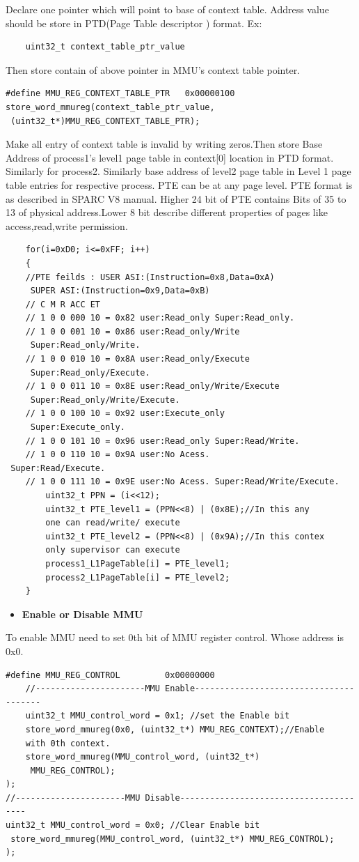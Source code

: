 \documentclass[12pt,a4paper]{article}
\begin{document}
Declare one pointer which will point to base of context table. Address value should be store in PTD(Page Table descriptor ) format.
Ex: 
\begin{lstlisting}
	uint32_t context_table_ptr_value 
 \end{lstlisting}
Then store contain of above pointer in MMU's context table pointer.
\begin{lstlisting}
#define MMU_REG_CONTEXT_TABLE_PTR	0x00000100
store_word_mmureg(context_table_ptr_value,
 (uint32_t*)MMU_REG_CONTEXT_TABLE_PTR);
 \end{lstlisting}
 
Make all entry of context table is invalid by writing zeros.Then store Base Address of process1's level1 page table in context[0] location in PTD format. Similarly for process2.
Similarly base address of level2 page table in Level 1 page table entries for respective process.
PTE can be at any page level.
PTE format is as described in SPARC V8 manual. Higher 24 bit of PTE contains Bits of 35 to 13 of physical address.Lower 8 bit describe different properties of pages like access,read,write permission.   
\begin{lstlisting}
	for(i=0xD0; i<=0xFF; i++)
	{
	//PTE feilds : USER ASI:(Instruction=0x8,Data=0xA)
	 SUPER ASI:(Instruction=0x9,Data=0xB)
	// C M R ACC ET
	// 1 0 0 000 10 = 0x82 user:Read_only Super:Read_only.
	// 1 0 0 001 10 = 0x86 user:Read_only/Write
	 Super:Read_only/Write.
	// 1 0 0 010 10 = 0x8A user:Read_only/Execute
	 Super:Read_only/Execute.
	// 1 0 0 011 10 = 0x8E user:Read_only/Write/Execute
	 Super:Read_only/Write/Execute.
	// 1 0 0 100 10 = 0x92 user:Execute_only
	 Super:Execute_only.
	// 1 0 0 101 10 = 0x96 user:Read_only Super:Read/Write.
	// 1 0 0 110 10 = 0x9A user:No Acess.
 Super:Read/Execute.
	// 1 0 0 111 10 = 0x9E user:No Acess. Super:Read/Write/Execute.
		uint32_t PPN = (i<<12);
		uint32_t PTE_level1 = (PPN<<8) | (0x8E);//In this any 
		one can read/write/ execute
		uint32_t PTE_level2 = (PPN<<8) | (0x9A);//In this contex 
		only supervisor can execute
		process1_L1PageTable[i] = PTE_level1;
		process2_L1PageTable[i] = PTE_level2;
	}
 \end{lstlisting}
 
\begin{itemize}
\item \textbf{Enable or Disable MMU}
\end{itemize} 
To enable MMU need to set 0th bit of MMU register control. Whose address is 0x0.
 \begin{lstlisting}
#define MMU_REG_CONTROL			0x00000000
	//----------------------MMU Enable---------------------------------------
	uint32_t MMU_control_word = 0x1; //set the Enable bit
	store_word_mmureg(0x0, (uint32_t*) MMU_REG_CONTEXT);//Enable 
	with 0th context.
	store_word_mmureg(MMU_control_word, (uint32_t*)
	 MMU_REG_CONTROL);
);
//----------------------MMU Disable---------------------------------------
uint32_t MMU_control_word = 0x0; //Clear Enable bit
 store_word_mmureg(MMU_control_word, (uint32_t*) MMU_REG_CONTROL);
);
 \end{lstlisting}
 
\end{document}
